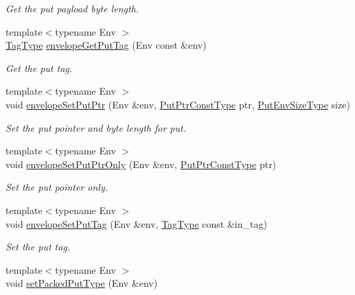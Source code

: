 \begin{DoxyCompactItemize}
\begin{DoxyCompactList}\small\item\em Get the put payload byte length. \end{DoxyCompactList}\item 
{\footnotesize template$<$typename Env $>$ }\\\hyperlink{namespacevt_a84ab281dae04a52a4b243d6bf62d0e52}{Tag\+Type} \hyperlink{namespacevt_aaf50340390d58fe42775ae5b8e413f28}{envelope\+Get\+Put\+Tag} (Env const \&env)
\begin{DoxyCompactList}\small\item\em Get the put tag. \end{DoxyCompactList}\item 
{\footnotesize template$<$typename Env $>$ }\\void \hyperlink{namespacevt_a17f0a4c162ef2b8337dfeab15f1c3a5b}{envelope\+Set\+Put\+Ptr} (Env \&env, \hyperlink{namespacevt_a494d6c6dc5cdb9a8d61eaedfa2c4d4f3}{Put\+Ptr\+Const\+Type} ptr, \hyperlink{namespacevt_aa241444e21c15238e185923792814fe4}{Put\+Env\+Size\+Type} size)
\begin{DoxyCompactList}\small\item\em Set the put pointer and byte length for put. \end{DoxyCompactList}\item 
{\footnotesize template$<$typename Env $>$ }\\void \hyperlink{namespacevt_a4e63ee5cc991a0a2052300feaae4bd4e}{envelope\+Set\+Put\+Ptr\+Only} (Env \&env, \hyperlink{namespacevt_a494d6c6dc5cdb9a8d61eaedfa2c4d4f3}{Put\+Ptr\+Const\+Type} ptr)
\begin{DoxyCompactList}\small\item\em Set the put pointer only. \end{DoxyCompactList}\item 
{\footnotesize template$<$typename Env $>$ }\\void \hyperlink{namespacevt_a43128d4858572c9b60cfc1c420acc882}{envelope\+Set\+Put\+Tag} (Env \&env, \hyperlink{namespacevt_a84ab281dae04a52a4b243d6bf62d0e52}{Tag\+Type} const \&in\+\_\+tag)
\begin{DoxyCompactList}\small\item\em Set the put tag. \end{DoxyCompactList}\item 
{\footnotesize template$<$typename Env $>$ }\\void \hyperlink{namespacevt_a2206947364b94e9c7dba38df257d095b}{set\+Packed\+Put\+Type} (Env \&env)

\end{DoxyCompactItemize}
